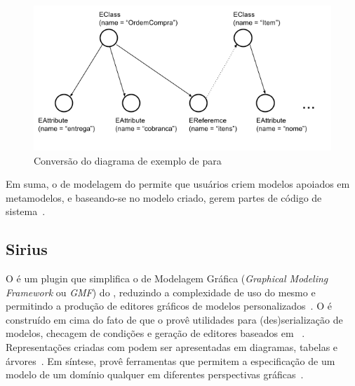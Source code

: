 \begin{figure}[h]
	\centering
	\includegraphics[width=1\textwidth]{figuras/exemplos-emf/uml-to-ecore.png}
	\caption{Conversão do diagrama de exemplo de \uml para \ecore}
	\label{exemplo-uml-to-ecore}
\end{figure}

Em suma, o \framework de modelagem do \eclipse permite que usuários criem modelos apoiados em metamodelos, e baseando-se no modelo criado, gerem partes de código de sistema~\cite{vujovic2014comparative}.


\subsection{Sirius}

O \sirius é um plugin que simplifica o \framework de Modelagem Gráfica (\textit{Graphical Modeling Framework} ou \textit{GMF}) do \eclipse, reduzindo a complexidade de uso do mesmo e permitindo a produção de editores gráficos de modelos personalizados~\cite{viyovic2014sirius}. O \sirius é construído em cima do fato de que o \eclipse provê utilidades para (des)serialização de modelos, checagem de condições e geração de editores baseados em \ecore~\cite{budinsky2004eclipse}. Representações criadas com \sirius podem ser apresentadas em diagramas, tabelas e árvores~\cite{viyovic2014sirius}. Em síntese, \sirius provê ferramentas que permitem a especificação de um modelo de um domínio qualquer em diferentes perspectivas gráficas~\cite{vujovic2014comparative}.

